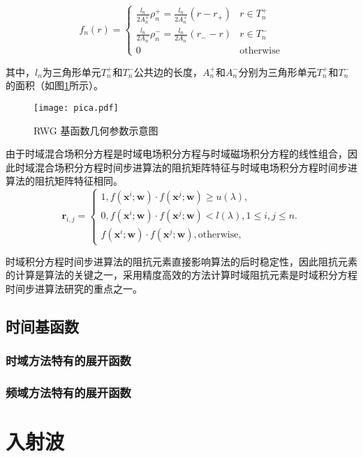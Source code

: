 \documentclass{standalone}
\begin{document}
\begin{equation}
f_n(r)=
\begin{cases}
\frac{l_n}{2A_n^+}\rho_n^+=\frac{l_n}{2A_n^+}(r-r_+)&r\in T_n^+\\
\frac{l_n}{2A_n^-}\rho_n^-=\frac{l_n}{2A_n^-}(r_--r)&r\in T_n^-\\
0&\text{otherwise}
\end{cases}
\end{equation}

其中，$l_n$为三角形单元$T_n^+$和$T_n^-$公共边的长度，$A_n^+$和$A_n^-$分别为三角形单元$T_n^+$和$T_n^-$的面积（如图\ref{pica}所示）。

\begin{figure}[h]
	\texttt{[image: pica.pdf]}
	\caption{RWG 基函数几何参数示意图}
	\label{pica}
\end{figure}
由于时域混合场积分方程是时域电场积分方程与时域磁场积分方程的线性组合，因此时域混合场积分方程时间步进算法的阻抗矩阵特征与时域电场积分方程时间步进算法的阻抗矩阵特征相同。
\begin{equation}
\label{latent_binary_variable}
\mathbf{r}_{i,j}=
\begin{cases}
1,f(\mathbf{x}^{i};\mathbf{w})\cdot f(\mathbf{x}^{j};\mathbf{w})\geq u(\lambda),\\
0,f(\mathbf{x}^{i};\mathbf{w})\cdot f(\mathbf{x}^{j};\mathbf{w})< l(\lambda), 1\leq i,j\leq n.\\
f(\mathbf{x}^{i};\mathbf{w})\cdot f(\mathbf{x}^{j};\mathbf{w}),\text{otherwise},
\end{cases}
\end{equation}

时域积分方程时间步进算法的阻抗元素直接影响算法的后时稳定性，因此阻抗元素的计算是算法的关键之一，采用精度高效的方法计算时域阻抗元素是时域积分方程时间步进算法研究的重点之一。


\subsection{时间基函数}

\subsubsection{时域方法特有的展开函数}

\subsubsection{频域方法特有的展开函数}

\section{入射波}
\end{document}
